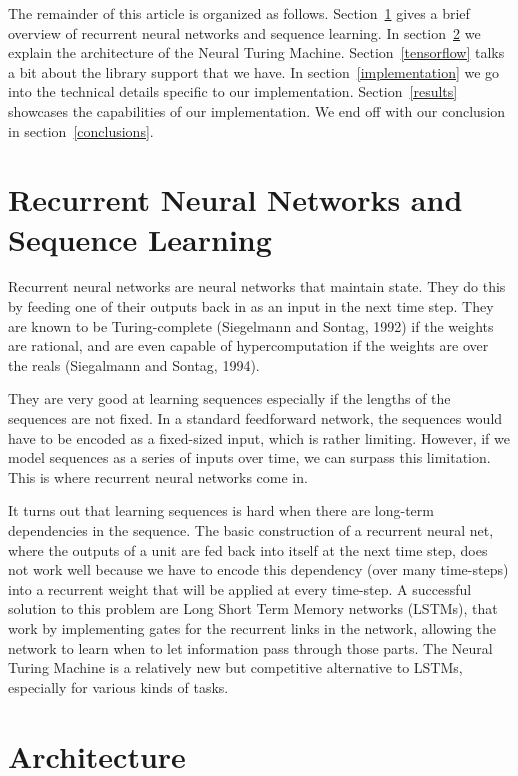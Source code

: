 \documentclass[12pt]{article}
\begin{document}
The remainder of this article is organized as follows.
Section~\ref{sequence} gives a brief overview of recurrent
neural networks and sequence learning.
In section~\ref{architecture} we explain the architecture of the Neural
Turing Machine. Section~\ref{tensorflow} talks a bit about the library
support that we have. In section~\ref{implementation} we
go into the technical details specific to our implementation.
Section~\ref{results} showcases the capabilities of our implementation.
We end off with our conclusion in section~\ref{conclusions}.

\section{Recurrent Neural Networks and Sequence Learning}\label{sequence}

Recurrent neural networks are neural networks that maintain state. They
do this by feeding one of their outputs back in as an input in the next time
step. They are known to be Turing-complete (Siegelmann and Sontag, 1992)
if the weights are rational, and are even capable of hypercomputation
if the weights are over the reals (Siegalmann and Sontag, 1994).

They are very good at learning sequences especially if the lengths of
the sequences are not fixed. In a standard feedforward network, the
sequences would have to be encoded as a fixed-sized input, which is rather
limiting. However, if we model sequences as a series of inputs over time,
we can surpass this limitation. This is where recurrent neural networks come
in.

It turns out that learning sequences is hard when there are long-term
dependencies in the sequence. The basic construction of a recurrent
neural net, where the outputs of a unit are fed back into itself at the next
time step, does not work well because we have to encode this dependency
(over many time-steps) into a recurrent weight that will be applied at every
time-step. A successful solution to this problem are Long Short Term Memory
networks (LSTMs), that work by implementing gates for the recurrent 
links in the network, allowing the network to learn when to let information
pass through those parts. The Neural Turing Machine is a relatively new
but competitive alternative to LSTMs, especially for various kinds of
tasks.

\section{Architecture}\label{architecture}
\end{document}
